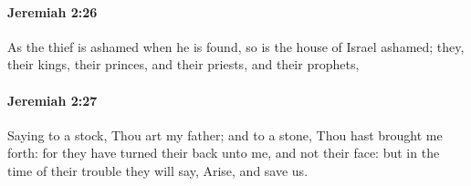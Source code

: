 		\paragraph{Jeremiah 2:26} %
			\label{JEREMIAH-2-26}

			As the thief is ashamed when he is found, so is the house of Israel ashamed; they, their kings, their princes, and their priests, and their prophets,


		\paragraph{Jeremiah 2:27} %
			\label{JEREMIAH-2-27}

			Saying to a stock, Thou art my father; and to a stone, Thou hast brought me forth: for they have turned their back unto me, and not their face: but in the time of their trouble they will say, Arise, and save us.


